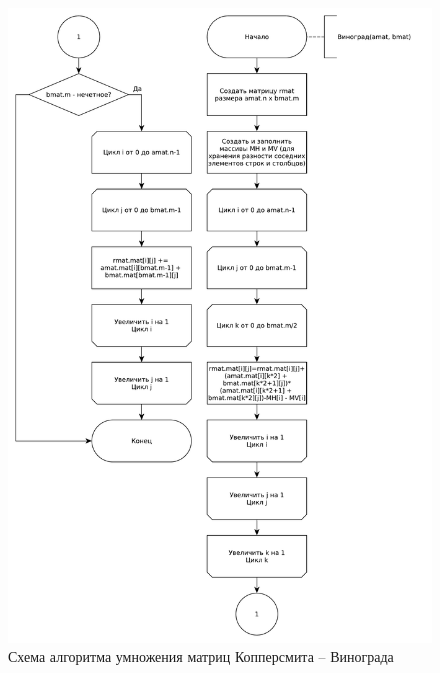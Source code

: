 \begin{figure}[ht!]
	\centering
	\includegraphics[width=0.95\linewidth]{assets/mtx-win1.pdf}
	\caption{Схема алгоритма умножения матриц Копперсмита -- Винограда}
	\label{fig:win-1}
\end{figure}

